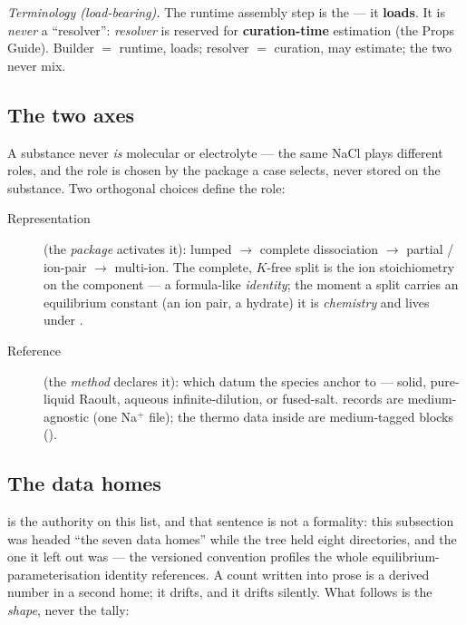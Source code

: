 \documentclass[11pt,a4paper]{article}
\begin{document}
\emph{Terminology (load-bearing).}  The runtime assembly step is the
 --- it \textbf{loads}.  It is \emph{never} a
``resolver'': \emph{resolver} is reserved for \textbf{curation-time} estimation
(the Props Guide).  Builder ${}={}$ runtime, loads; resolver ${}={}$ curation,
may estimate; the two never mix.

\subsection{The two axes}

A substance never \emph{is} molecular or electrolyte --- the same NaCl plays
different roles, and the role is chosen by the package a case selects, never
stored on the substance.  Two orthogonal choices define the role:

\begin{description}
\item[Representation] (the \emph{package} activates it): lumped $\to$ complete
  dissociation $\to$ partial / ion-pair $\to$ multi-ion.  The complete,
  $K$-free split is the  ion stoichiometry on the
  component --- a formula-like \emph{identity}; the moment a split carries an
  equilibrium constant (an ion pair, a hydrate) it is \emph{chemistry} and
  lives under .
\item[Reference] (the \emph{method} declares it): which datum the species
  anchor to --- solid, pure-liquid Raoult, aqueous infinite-dilution, or
  fused-salt.   records are medium-agnostic (one Na$^{+}$ file);
  the thermo data inside are medium-tagged blocks ().
\end{description}

\subsection{The data homes}

 is the authority on this list, and that sentence is
not a formality: this subsection was headed ``the seven data homes'' while the
tree held eight directories, and the one it left out was
 --- the versioned convention profiles the whole
equilibrium-parameterisation identity references.  A count written into prose
is a derived number in a second home; it drifts, and it drifts silently.  What
follows is the \emph{shape}, never the tally:
\end{document}
